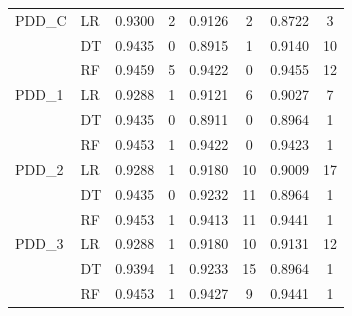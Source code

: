 \begin{table}[h]
\begin{tabular}{llcccccc}
    \midrule
    PDD\_C   & LR & 0.9300 & 2 & 0.9126 & 2 & 0.8722 & 3 \\
             & DT & 0.9435 & 0 & 0.8915 & 1 & 0.9140 & 10 \\
             & RF & 0.9459 & 5 & 0.9422 & 0 & 0.9455 & 12 \\
    \midrule
    PDD\_1   & LR & 0.9288 & 1 & 0.9121 & 6 & 0.9027 & 7 \\
             & DT & 0.9435 & 0 & 0.8911 & 0 & 0.8964 & 1 \\
             & RF & 0.9453 & 1 & 0.9422 & 0 & 0.9423 & 1 \\
    \midrule
    PDD\_2   & LR & 0.9288 & 1 & 0.9180 & 10 & 0.9009 & 17 \\
             & DT & 0.9435 & 0 & 0.9232 & 11 & 0.8964 & 1 \\
             & RF & 0.9453 & 1 & 0.9413 & 11 & 0.9441 & 1 \\
    \midrule
    PDD\_3   & LR & 0.9288 & 1 & 0.9180 & 10 & 0.9131 & 12 \\
             & DT & 0.9394 & 1 & 0.9233 & 15 & 0.8964 & 1 \\
             & RF & 0.9453 & 1 & 0.9427 & 9 & 0.9441 & 1 \\
    \bottomrule
    \end{tabular}
\end{table}


